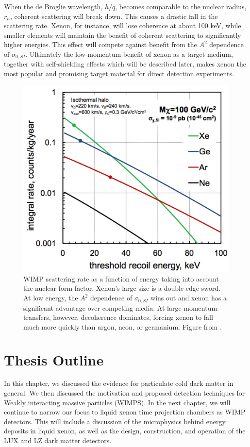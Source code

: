 When the de Broglie wavelength, $h/q$, becomes comparable to the nuclear radius, $r_n$, coherent scattering will break down. This causes a drastic fall in the scattering rate. Xenon, for instance, will lose coherence at about 100 keV, while smaller elements will maintain the benefit of coherent scattering to significantly higher energies. This effect will compete against benefit from the $A^2$ dependence of $\sigma_{0,SI}$. Ultimately the low-momentum benefit of xenon as a target medium, together with self-shielding effects which will be described later, makes xenon the most popular and promising target material for direct detection experiments.
\begin{figure}[h!]
\centering
\includegraphics[width=150mm]{Figures/recoil_spec.pdf}
\caption{WIMP scattering rate as a function of energy taking into account the nuclear form factor. Xenon's large size is a double edge sword. At low energy, the $A^2$ dependence of $\sigma_{0,SI}$ wins out and xenon has a significant advantage over competing media. At large momentum transfers, however, decoherence dominates, forcing xenon to fall much more quickly than argon, neon, or germanium. Figure from \cite{henrique}.}
\label{fig:helm} 
\end{figure}




\section{Thesis Outline}
In this chapter, we discussed the evidence for particulate cold dark matter in general. We then discussed the motivation and proposed detection techniques for Weakly interacting massive particles (WIMPS). In the next chapter, we will continue to narrow our focus to liquid xenon time projection chambers as WIMP detectors. This will include a discussion of the microphysics behind energy deposits in liquid xenon, as well as the design, construction, and operation of the LUX and LZ dark matter detectors.

